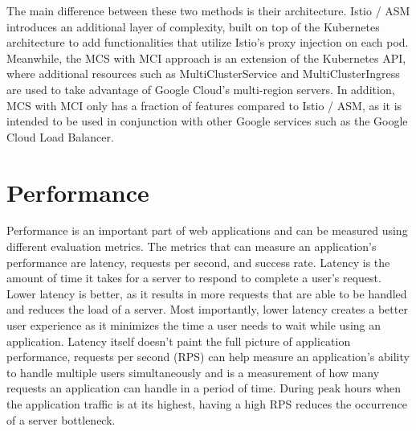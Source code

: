 The main difference between these two methods is their architecture. Istio / ASM introduces an additional layer of complexity, built on top of the Kubernetes architecture to add functionalities that utilize Istio's proxy injection on each pod. Meanwhile, the MCS with MCI approach is an extension of the Kubernetes API, where additional resources such as MultiClusterService and MultiClusterIngress are used to take advantage of Google Cloud's multi-region servers. In addition, MCS with MCI only has a fraction of features compared to Istio / ASM, as it is intended to be used in conjunction with other Google services such as the Google Cloud Load Balancer.


\section{Performance}
Performance is an important part of web applications and can be measured using different evaluation metrics. The metrics that can measure an application's performance are latency, requests per second, and success rate. Latency is the amount of time it takes for a server to respond to complete a user's request. Lower latency is better, as it results in more requests that are able to be handled and reduces the load of a server. Most importantly, lower latency creates a better user experience as it minimizes the time a user needs to wait while using an application. Latency itself doesn't paint the full picture of application performance, requests per second (RPS) can help measure an application's ability to handle multiple users simultaneously and is a measurement of how many requests an application can handle in a period of time. During peak hours when the application traffic is at its highest, having a high RPS reduces the occurrence of a server bottleneck.

